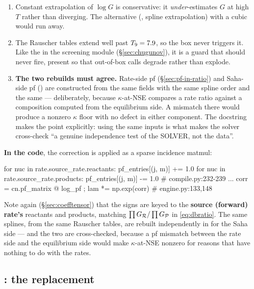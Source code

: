 \begin{enumerate}
\item Constant extrapolation of $\log G$ is conservative: it
      \emph{under}-estimates $G$ at high $T$ rather than diverging. The
      alternative (, spline extrapolation) with a cubic would run
      away.
\item The Rauscher tables extend well past $T_{9} = 7.9$, so the box never
      triggers it. Like the  in the screening module
      (\S\ref{sec:chugunov}), it is a guard that should never fire, present so
      that out-of-box calls degrade rather than explode.
\item \textbf{The two rebuilds must agree.} Rate-side pf
      (\S\ref{sec:pf-in-ratio}) and Saha-side pf () are
      constructed from the same fields with the same spline order and the same
       --- deliberately, because $\kappa$-at-NSE compares a rate ratio
      against a composition computed from the equilibrium side. A mismatch there
      would produce a nonzero $\kappa$ floor with no defect in either component.
      The  docstring makes the point explicitly: using the
      same inputs is what makes the solver cross-check ``a genuine independence
      test of the SOLVER, not the data''.
\end{enumerate}

\textbf{In the code}, the correction is applied as a sparse incidence matmul:

\begin{srclisting}
for nuc in rate.source_rate.reactants:   pf_entries[(j, m)] += 1.0
for nuc in rate.source_rate.products:    pf_entries[(j, m)] -= 1.0   # compile.py:232-239
...
corr = cn.pf_matrix @ log_pf ;  lam *= np.exp(corr)                  # engine.py:133,148
\end{srclisting}

Note again (\S\ref{sec:coefftensor}) that the signs are keyed to the
\textbf{source (forward) rate's} reactants and products, matching
$\prod G_{\mathcal{R}}/\prod G_{\mathcal{P}}$ in \eqref{eq:dbratio}. The same splines, from
the same Rauscher tables, are rebuilt independently in  for
the Saha side --- and the two are cross-checked, because a pf mismatch between
the rate side and the equilibrium side would make $\kappa$-at-NSE nonzero for
reasons that have nothing to do with the rates.

\subsection{\texorpdfstring{}{db reverses.py}: the replacement}
\label{sec:db-replacement}

